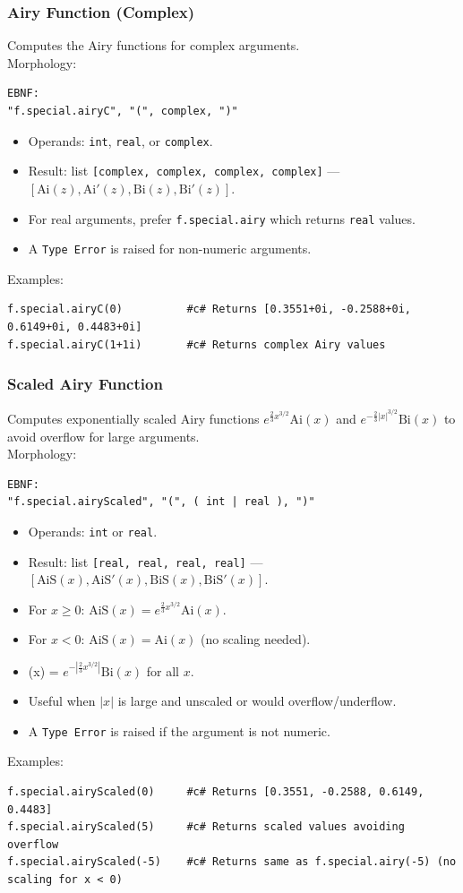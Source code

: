 \subsubsection{Airy Function (Complex)}
Computes the Airy functions for complex arguments. \\
Morphology:
\begin{verbatim}
EBNF:
"f.special.airyC", "(", complex, ")"
\end{verbatim}
\begin{itemize}
\item Operands: \texttt{int}, \texttt{real}, or \texttt{complex}.
\item Result: list \texttt{[complex, complex, complex, complex]} --- $[\text{Ai}(z), \text{Ai}'(z), \text{Bi}(z), \text{Bi}'(z)]$.
\item For real arguments, prefer \texttt{f.special.airy} which returns \texttt{real} values.
\item A \texttt{Type Error} is raised for non-numeric arguments.
\end{itemize}
Examples:
\begin{verbatim}
f.special.airyC(0)          #c# Returns [0.3551+0i, -0.2588+0i, 0.6149+0i, 0.4483+0i]
f.special.airyC(1+1i)       #c# Returns complex Airy values
\end{verbatim}

\subsubsection{Scaled Airy Function}
Computes exponentially scaled Airy functions $e^{\frac{2}{3} x^{3/2}} \text{Ai}(x)$ and $e^{-\frac{2}{3} |x|^{3/2}} \text{Bi}(x)$ to avoid overflow for large arguments. \\
Morphology:
\begin{verbatim}
EBNF:
"f.special.airyScaled", "(", ( int | real ), ")"
\end{verbatim}
\begin{itemize}
\item Operands: \texttt{int} or \texttt{real}.
\item Result: list \texttt{[real, real, real, real]} --- $[\text{AiS}(x), \text{AiS}'(x), \text{BiS}(x), \text{BiS}'(x)]$.
\item For $x \geq 0$: $\text{AiS}(x) = e^{\frac{2}{3} x^{3/2}} \text{Ai}(x)$.
\item For $x < 0$: $\text{AiS}(x) = \text{Ai}(x)$ (no scaling needed).
\item {}(x) = $e^{-|\frac{2}{3} x^{3/2}|} \text{Bi}(x)$ for all $x$.
\item Useful when $|x|$ is large and unscaled  or  would overflow/underflow.
\item A \texttt{Type Error} is raised if the argument is not numeric.
\end{itemize}
Examples:
\begin{verbatim}
f.special.airyScaled(0)     #c# Returns [0.3551, -0.2588, 0.6149, 0.4483]
f.special.airyScaled(5)     #c# Returns scaled values avoiding overflow
f.special.airyScaled(-5)    #c# Returns same as f.special.airy(-5) (no scaling for x < 0)
\end{verbatim}

